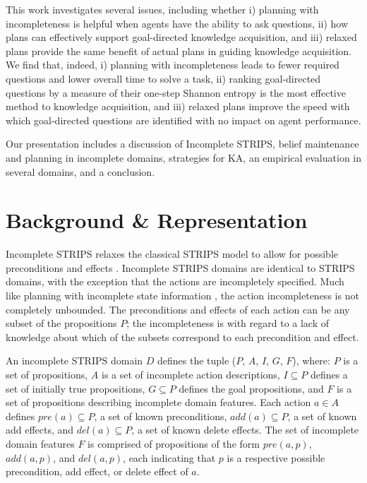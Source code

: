 \documentclass{article}
\begin{document}
This work investigates several issues, including whether i)
planning with incompleteness is helpful when agents have the ability to ask questions, ii) how
plans can effectively support goal-directed knowledge acquisition, and iii)
relaxed plans provide the same benefit of actual plans in guiding knowledge
acquisition.  We find that, indeed, i) planning with incompleteness leads to
fewer required questions and lower overall time to solve a task, ii) ranking
goal-directed questions by a measure of their one-step Shannon entropy is the
most effective method to knowledge acquisition, and iii) relaxed plans improve
the speed with which goal-directed questions are identified with no
impact on agent performance.

Our presentation includes a discussion of Incomplete STRIPS, belief maintenance
and planning in incomplete domains, strategies for KA, an empirical evaluation in several domains,
 and a conclusion.

\section{Background \& Representation}\label{sec:background}

Incomplete STRIPS relaxes the classical STRIPS model to allow for
possible preconditions and effects \citep{Garland02}.  
Incomplete STRIPS domains are identical to STRIPS domains, with the exception
that the actions are incompletely specified.  Much like planning with incomplete
state information \citep{bonet00planning}, the action incompleteness is not
completely unbounded.  The preconditions and effects of each action can be any
subset of the propositions $P$; the incompleteness is with regard to a lack of
knowledge about which of the subsets correspond to each precondition and effect.        

 An incomplete STRIPS domain ${D}$  defines the
tuple ($P$, ${A}$, $I$, $G$, $F$), where: $P$ is a  set of propositions, ${A}$
is a set of incomplete  action descriptions, $I \subseteq P$ defines a set of
initially true  propositions, $G \subseteq P$ defines the goal propositions, and
$F$ is a set of propositions describing incomplete domain features. Each action
${a} \in {A}$ defines $pre({a}) \subseteq P$, a set of known preconditions,
$add({a}) \subseteq P$, a set of known add  effects, and $del({a}) \subseteq P$,
a set of known delete effects.   The set of incomplete domain features $F$ is
comprised of propositions of the form $pre({a}, p)$, $add({a}, p)$, and
$del({a}, p)$, each indicating that $p$ is a respective possible precondition, add effect, or
delete effect of $a$.
\end{document}
